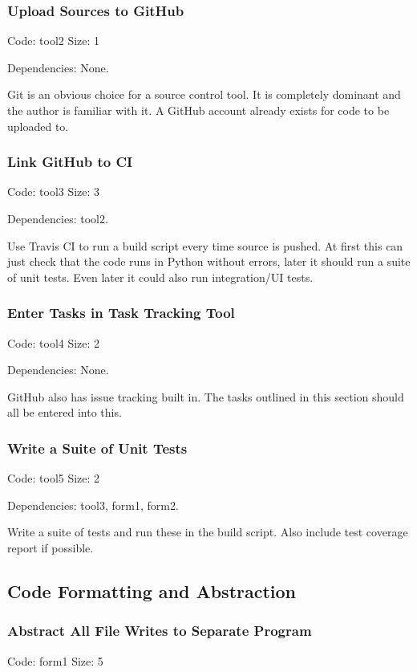 \documentclass[a4paper,12pt]{article}
\begin{document}
\subsubsection{Upload Sources to GitHub}
Code: tool2	\hfill Size: 1

Dependencies: None.

Git is an obvious choice for a source control tool. It is completely dominant and the author is familiar with it. A GitHub account already exists for code to be uploaded to.

\subsubsection{Link GitHub to CI}
Code: tool3	\hfill Size: 3

Dependencies: tool2.

Use Travis CI to run a build script every time source is pushed. At first this can just check that the code runs in Python without errors, later it should run a suite of unit tests. Even later it could also run integration/UI tests.

\subsubsection{Enter Tasks in Task Tracking Tool}
Code: tool4	\hfill Size: 2

Dependencies: None.

GitHub also has issue tracking built in. The tasks outlined in this section should all be entered into this. 

\subsubsection{Write a Suite of Unit Tests}
Code: tool5	\hfill Size: 2

Dependencies: tool3, form1, form2.

Write a suite of tests and run these in the build script. Also include test coverage report if possible.

\subsection{Code Formatting and Abstraction}

\subsubsection{Abstract All File Writes to Separate Program}
Code: form1	\hfill Size: 5
\end{document}
